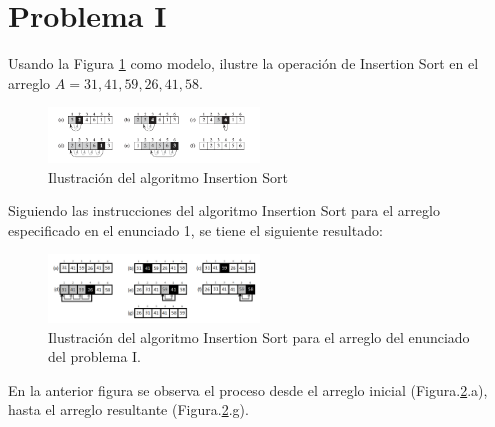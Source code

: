 \section{Problema I}
Usando la Figura \ref{fig1} como modelo, ilustre la operación de Insertion Sort en el arreglo $A = {31, 41, 59, 26, 41, 58}$.
    
    \begin{figure}[H]
    \centering
    \includegraphics[width=0.5\textwidth]{img/fig1}
    \caption{Ilustración del algoritmo Insertion Sort}
    \label{fig1}
    \end{figure}

Siguiendo las instrucciones del algoritmo Insertion Sort para el arreglo especificado en el enunciado 1, se tiene el siguiente resultado:

    \begin{figure}[H]
    \centering
    \includegraphics[width=0.5\textwidth]{img/fig2}
    \caption{Ilustración del algoritmo Insertion Sort para el arreglo del enunciado del problema I.}
    \label{fig2}
    \end{figure}
    
En la anterior figura se observa el proceso desde el arreglo inicial (Figura.\ref{fig2}.a), hasta el arreglo resultante (Figura.\ref{fig2}.g).